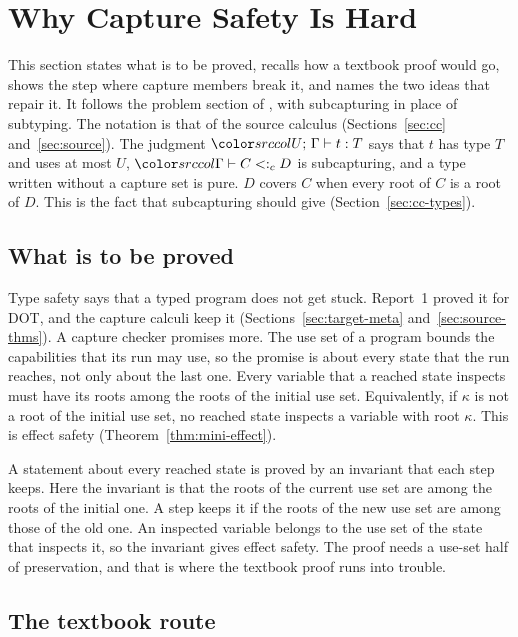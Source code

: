 \section{Why Capture Safety Is Hard}\label{sec:problem}
\mathsrc

This section states what is to be proved, recalls how a textbook proof would go, shows the step where capture members break it, and names the two ideas that repair it. It follows the problem section of \Rone, with subcapturing in place of subtyping. The notation is that of the source calculus (Sections~\ref{sec:cc} and~\ref{sec:source}). The judgment $\dtyuj{U}{\Gamma}{t}{T}$ says that $t$ has type $T$ and uses at most $U$, $\subcj{\Gamma}{C}{D}$ is subcapturing, and a type written without a capture set is pure. $D$ covers $C$ when every root of $C$ is a root of $D$. This is the fact that subcapturing should give (Section~\ref{sec:cc-types}).

\subsection{What is to be proved}\label{sec:problem-goal}

Type safety says that a typed program does not get stuck. Report~1 proved it for DOT, and the capture calculi keep it (Sections~\ref{sec:target-meta} and~\ref{sec:source-thms}). A capture checker promises more. The use set of a program bounds the capabilities that its run may use, so the promise is about every state that the run reaches, not only about the last one. Every variable that a reached state inspects must have its roots among the roots of the initial use set. Equivalently, if $\kappa$ is not a root of the initial use set, no reached state inspects a variable with root $\kappa$. This is effect safety (Theorem~\ref{thm:mini-effect}).

A statement about every reached state is proved by an invariant that each step keeps. Here the invariant is that the roots of the current use set are among the roots of the initial one. A step keeps it if the roots of the new use set are among those of the old one. An inspected variable belongs to the use set of the state that inspects it, so the invariant gives effect safety. The proof needs a use-set half of preservation, and that is where the textbook proof runs into trouble.

\subsection{The textbook route}\label{sec:problem-textbook}

